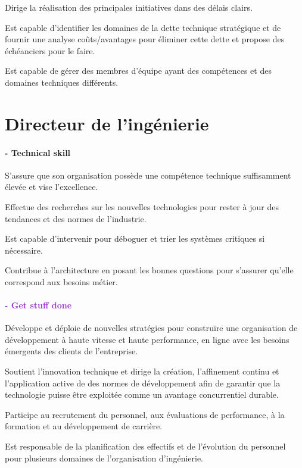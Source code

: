\documentclass[a4paper, french, openany, 12pt]{book}
\newcommand\dex{\textcolor{BrickRed}{\textbf{\bsc{Dexterity} - Technical skill}}}
\newcommand\str{\textcolor{DarkOrchid}{\textbf{\bsc{Strength} - Get stuff done}}}
\begin{document}
Dirige la réalisation des principales initiatives dans des délais clairs.

Est capable d'identifier les domaines de la dette technique stratégique et de fournir une analyse coûts/avantages pour 
éliminer cette dette et propose des échéanciers pour le faire.

Est capable de gérer des membres d'équipe ayant des compétences et des domaines techniques différents.

\chapter{Directeur de l'ingénierie}

\subsubsection*{\dex}

S'assure que son organisation possède une compétence technique suffisamment élevée et vise l'excellence.

Effectue des recherches sur les nouvelles technologies pour rester à jour des tendances et des normes de l'industrie.

Est capable d'intervenir pour déboguer et trier les systèmes critiques si nécessaire.

Contribue à l'architecture en posant les bonnes questions pour s'assurer qu'elle correspond aux besoins métier.

\subsubsection*{\str}

Développe et déploie de nouvelles stratégies pour construire une organisation de développement à haute vitesse et haute 
performance, en ligne avec les besoins émergents des clients de l'entreprise.

Soutient l'innovation technique et dirige la création, l'affinement continu et l'application active de des normes de 
développement afin de garantir que la technologie puisse être exploitée comme un avantage concurrentiel durable.

Participe au recrutement du personnel, aux évaluations de performance, à la formation et au développement de carrière. 

Est responsable de la planification des effectifs et de l'évolution du personnel pour plusieurs domaines de 
l'organisation d'ingénierie.
\end{document}

